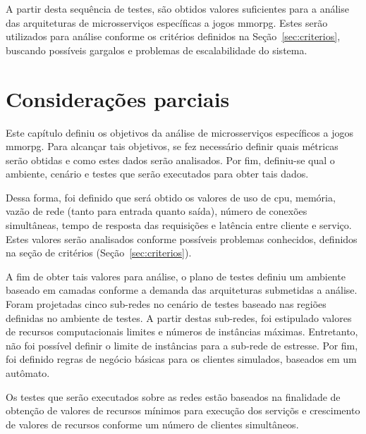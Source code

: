 A partir desta sequência de testes, são obtidos valores suficientes para a análise das arquiteturas de microsserviços específicas a jogos \ac{mmorpg}.
%
Estes serão utilizados para análise conforme os critérios definidos na Seção~\ref{sec:criterios}, buscando possíveis gargalos e problemas de escalabilidade do sistema.


\section{Considerações parciais}


Este capítulo definiu os objetivos da análise de microsserviços específicos a jogos \ac{mmorpg}.
%
Para alcançar tais objetivos, se fez necessário definir quais métricas serão obtidas e como estes dados serão analisados.
%
Por fim, definiu-se qual o ambiente, cenário e testes que serão executados para obter tais dados.

Dessa forma, foi definido que será obtido os valores de uso de \ac{cpu}, memória, vazão de rede (tanto para entrada quanto saída), número de conexões simultâneas, tempo de resposta das requisições e latência entre cliente e serviço.
%
Estes valores serão analisados conforme possíveis problemas conhecidos, definidos na seção de critérios (Seção~\ref{sec:criterios}).

A fim de obter tais valores para análise, o plano de testes definiu um ambiente baseado em camadas conforme a demanda das arquiteturas submetidas a análise.
%
Foram projetadas cinco sub-redes no cenário de testes baseado nas regiões definidas no ambiente de testes.
%
A partir destas sub-redes, foi estipulado valores de recursos computacionais limites e números de instâncias máximas.
%
Entretanto, não foi possível definir o limite de instâncias para a sub-rede de estresse.
%
Por fim, foi definido regras de negócio básicas para os clientes simulados, baseados em um autômato.

Os testes que serão executados sobre as redes estão baseados na finalidade de obtenção de valores de recursos mínimos para execução dos serviçõs e crescimento de valores de recursos conforme um número de clientes simultâneos.